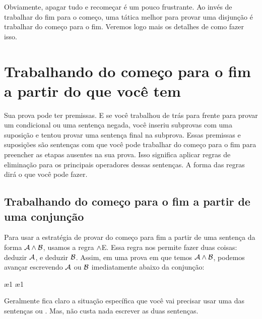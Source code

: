 \begin{fitchproof}
	\ellipsesline 
\end{fitchproof}
 Obviamente, apagar tudo e recomeçar é um pouco frustrante. Ao invés de trabalhar do fim para o começo, uma tática melhor para provar uma disjunção é trabalhar do começo para o fim. Veremos logo mais os detalhes de como fazer isso.



\section{Trabalhando do começo para o fim a partir do que você tem}

Sua prova pode ter premissas. E se você trabalhou de trás para frente para provar um condicional ou uma sentença negada, você inseriu subprovas com uma suposição e tentou provar uma sentença final na subprova. Essas premissas e suposições são sentenças com que você pode trabalhar do começo para o fim para preencher as etapas ausentes na sua prova. Isso significa aplicar regras de eliminação para os principais operadores dessas sentenças. A forma das regras dirá o que você pode fazer. 

\subsection*{Trabalhando do começo para o fim a partir de uma conjunção}

Para usar a estratégia de provar do  começo para fim a partir de uma sentença da forma $\mathcal{A} \wedge \mathcal{B}$, usamos a regra $\wedge$E. Essa regra nos permite fazer duas coisas: deduzir $\mathcal{A}$, e deduzir $\mathcal{B}$. Assim, em uma prova em que temos $\mathcal{A} \wedge \mathcal{B}$, podemos avançar escrevendo $\mathcal{A}$ ou $\mathcal{B}$  imediatamente abaixo da conjunção:

\begin{fitchproof}
  \ae{1}
  \ae{1}
\end{fitchproof}
Geralmente fica claro a situação específica que você vai  precisar usar uma das sentenças  ou .  Mas, não custa nada escrever as  duas sentenças. 

